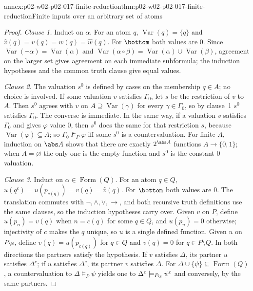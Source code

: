 \begin{annexitem}{annex:p02-w02-p02-017-finite-reduction}{thm:p02-w02-p02-017-finite-reduction}{Finite inputs over an arbitrary set of atoms}
\begin{proof}
\emph{Clause 1.}  Induct on \(\alpha\).  For an atom \(q\),
\(\operatorname{Var}(q)=\{q\}\) and \(\widehat v(q)=v(q)=w(q)=\widehat
w(q)\).  For \(\bottom\) both values are \(0\).  Since
\(\operatorname{Var}(\neg\alpha)=\operatorname{Var}(\alpha)\) and
\(\operatorname{Var}(\alpha\circ\beta)=\operatorname{Var}(\alpha)\cup
\operatorname{Var}(\beta)\), agreement on the larger set gives agreement
on each immediate subformula; the induction hypotheses and the common
truth clause give equal values.

\emph{Clause 2.}  The valuation \(s^{0}\) is defined by cases on the
membership \(q\in A\); no choice is involved.  If some valuation \(v\)
satisfies \(\Gamma_0\), let \(s\) be the restriction of \(v\) to \(A\).
Then \(s^{0}\) agrees
with \(v\) on \(A\supseteq\operatorname{Var}(\gamma)\) for every
\(\gamma\in\Gamma_0\), so by clause~1 \(s^{0}\) satisfies \(\Gamma_0\).
The converse is immediate.  In the same way, if a valuation \(v\)
satisfies \(\Gamma_0\) and gives \(\varphi\) value \(0\), then
\(s^{0}\) does the same for that restriction \(s\), because
\(\operatorname{Var}(\varphi)\subseteq A\); so
\(\Gamma_0\not\models_P\varphi\) iff some \(s^{0}\) is a
countervaluation.  For finite \(A\), induction on \(\abs A\) shows that
there are exactly \(2^{\abs A}\) functions \(A\to\{0,1\}\); when
\(A=\varnothing\) the only one is the empty function and \(s^{0}\) is
the constant \(0\) valuation.

\emph{Clause 3.}  Induct on \(\alpha\in\operatorname{Form}(Q)\).  For an
atom \(q\in Q\), \(\widehat u(q^{c})=u(p_{c(q)})=v(q)=\widehat v(q)\).
For \(\bottom\) both values are \(0\).  The translation commutes with
\(\neg,\land,\lor,\to\), and both recursive truth definitions use the
same clauses, so the induction hypotheses carry over.  Given \(v\) on
\(P\), define \(u(p_n)=v(q)\) when \(n=c(q)\) for some \(q\in Q\), and
\(u(p_n)=0\) otherwise; injectivity of \(c\) makes the \(q\) unique, so
\(u\) is a single defined function.  Given \(u\) on \(P_{\N}\), define
\(v(q)=u(p_{c(q)})\) for \(q\in Q\) and \(v(q)=0\) for
\(q\in P\setminus Q\).  In both directions the partners satisfy the
hypothesis.  If \(v\) satisfies \(\Delta\), its partner \(u\) satisfies
\(\Delta^{c}\); if \(u\) satisfies \(\Delta^{c}\), its partner \(v\)
satisfies \(\Delta\).  For \(\Delta\cup\{\psi\}\subseteq
\operatorname{Form}(Q)\), a countervaluation to \(\Delta\models_P\psi\)
yields one to \(\Delta^{c}\models_{P_{\N}}\psi^{c}\) and conversely, by the same
partners.


\end{proof}
\end{annexitem}
